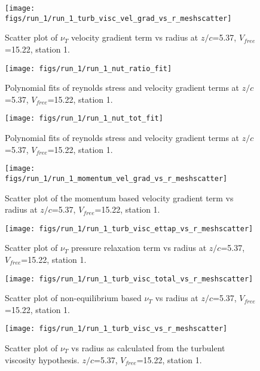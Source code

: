 \begin{figure}[H]
\centering
\texttt{[image: figs/run\_1/run\_1\_turb\_visc\_vel\_grad\_vs\_r\_meshscatter]}
\caption{Scatter plot of $\nu_T$ velocity gradient term vs radius at $z/c$=5.37, $V_{free}$=15.22, station 1.}
\end{figure}


\begin{figure}[H]
\centering
\texttt{[image: figs/run\_1/run\_1\_nut\_ratio\_fit]}
\caption{Polynomial fits of reynolds stress and velocity gradient terms at $z/c$=5.37, $V_{free}$=15.22, station 1.}
\end{figure}


\begin{figure}[H]
\centering
\texttt{[image: figs/run\_1/run\_1\_nut\_tot\_fit]}
\caption{Polynomial fits of reynolds stress and velocity gradient terms at $z/c$=5.37, $V_{free}$=15.22, station 1.}
\end{figure}


\begin{figure}[H]
\centering
\texttt{[image: figs/run\_1/run\_1\_momentum\_vel\_grad\_vs\_r\_meshscatter]}
\caption{Scatter plot of the momentum based velocity gradient term vs radius at $z/c$=5.37, $V_{free}$=15.22, station 1.}
\end{figure}


\begin{figure}[H]
\centering
\texttt{[image: figs/run\_1/run\_1\_turb\_visc\_ettap\_vs\_r\_meshscatter]}
\caption{Scatter plot of $\nu_T$ pressure relaxation term vs radius at $z/c$=5.37, $V_{free}$=15.22, station 1.}
\end{figure}


\begin{figure}[H]
\centering
\texttt{[image: figs/run\_1/run\_1\_turb\_visc\_total\_vs\_r\_meshscatter]}
\caption{Scatter plot of non-equilibrium based $\nu_T$ vs radius at $z/c$=5.37, $V_{free}$=15.22, station 1.}
\end{figure}


\begin{figure}[H]
\centering
\texttt{[image: figs/run\_1/run\_1\_turb\_visc\_vs\_r\_meshscatter]}
\caption{Scatter plot of $\nu_T$ vs radius as calculated from the turbulent viscosity hypothesis. $z/c$=5.37, $V_{free}$=15.22, station 1.}
\end{figure}


